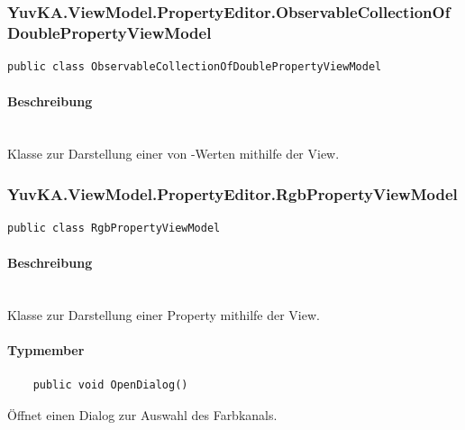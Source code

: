 \subsubsection{YuvKA.ViewModel.PropertyEditor.ObservableCollectionOfDoublePropertyViewModel}

\begin{verbatim}
public class ObservableCollectionOfDoublePropertyViewModel
\end{verbatim}

\paragraph{Beschreibung}~\\
Klasse zur Darstellung einer  von -Werten mithilfe der View.



\subsubsection{YuvKA.ViewModel.PropertyEditor.RgbPropertyViewModel}

\begin{verbatim}
public class RgbPropertyViewModel
\end{verbatim}

\paragraph{Beschreibung}~\\
Klasse zur Darstellung einer  Property mithilfe der View.

\paragraph{Typmember}
\begin{itemize}
	
	\begin{verbatim}
	public void OpenDialog()
	\end{verbatim}
	Öffnet einen Dialog zur Auswahl des Farbkanals.

\end{itemize}


